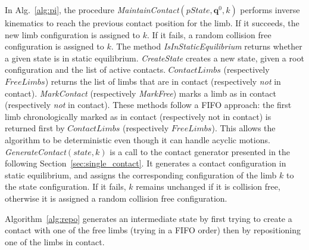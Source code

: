 In Alg.~\ref{alg:pi}, the procedure \textit{MaintainContact}$(pState,\mathbf{q}^0,k)$ performs inverse kinematics to reach the previous contact position for the limb.
If it succeeds, the new limb configuration is assigned to $k$. If it fails, a random collision free configuration is assigned to $k$.
The method \textit{IsInStaticEquilibrium} returns whether a given state is in static equilibrium. \textit{CreateState} creates a new state, given
a root configuration and the list of active contacts.
$ContactLimbs$ (respectively $FreeLimbs$) returns the list of limbs that are in contact (respectively \textit{not} in contact).  \textit{MarkContact} (respectively \textit{MarkFree})  marks a limb as in contact (respectively \textit{not} in contact). These methods follow a FIFO approach: the first limb chronologically marked as in contact (respectively not in contact) is returned first by $ContactLimbs$ (respectively $FreeLimbs$). This allows the algorithm to be deterministic even though it can handle acyclic motions.
%
%
\textit{GenerateContact}$(state,k)$ is a call to the contact generator presented in the following Section~\ref{sec:single_contact}.
It generates a contact configuration in static equilibrium, and assigns the corresponding configuration of the limb $k$ to the state configuration.
If it fails, $k$ remains unchanged if it is collision free, otherwise it is assigned a random collision free configuration.

Algorithm~\ref{alg:repo} generates an intermediate state by first trying to create a contact with one of the free limbs (trying in a FIFO order) then by repositioning one of the limbs in contact.

